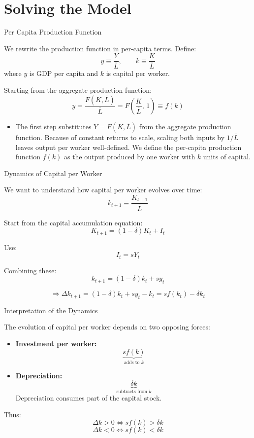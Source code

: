 \documentclass[10pt,aspectratio=169]{beamer}
\begin{document}
\section{Solving the Model}

\begin{frame}{Per Capita Production Function}

We rewrite the production function in per-capita terms. Define:
\[
y \equiv \frac{Y}{\bar{L}}, \qquad 
k \equiv \frac{K}{\bar{L}}
\]
where \(y\) is GDP per capita and \(k\) is capital per worker.

\bigskip

Starting from the aggregate production function:
\[
y = \frac{F(K,\bar{L})}{\bar{L}} = F\!\left(\frac{K}{\bar{L}},\,1\right) \equiv f(k)
\]

\begin{itemize}
    \item The first step substitutes \(Y = F(K,\bar{L})\) from the aggregate production function.
    \itemvso Because of constant returns to scale, scaling both inputs by \(1/\bar{L}\) leaves output per worker well-defined.
    \itemvso We define the per-capita production function \(f(k)\) as the output produced by one worker with \(k\) units of capital.
\end{itemize}

\end{frame}

\begin{frame}{Dynamics of Capital per Worker}

We want to understand how capital per worker evolves over time:
\[
k_{t+1} \equiv \frac{K_{t+1}}{\bar{L}}
\]

Start from the capital accumulation equation:
\[
K_{t+1} = (1-\delta)K_t + I_t
\]

Use:
\[
I_t = sY_t
\]

Combining these:
\[
k_{t+1}
= (1-\delta)k_t + s y_t
\]

\[
\Rightarrow 
\Delta k_{t+1} 
=(1-\delta)k_t + s y_t-k_t= s f(k_t) - \delta k_t
\]

\end{frame}

\begin{frame}{Interpretation of the Dynamics}

The evolution of capital per worker depends on two opposing forces:

\bigskip

\begin{itemize}
    \item \textbf{Investment per worker:} 
    \[
    \underbrace{s f(k)}_{\text{adds to }k}
    \]
    
    \item \textbf{Depreciation:}
    \[
    \underbrace{\delta k}_{\text{subtracts from }k}
    \]
    Depreciation consumes part of the capital stock.
\end{itemize}

\bigskip

Thus:
\[
\Delta k > 0 \iff s f(k) > \delta  k
\]
\[
\Delta k < 0 \iff s f(k) < \delta  k
\]

\end{frame}
\end{document}
